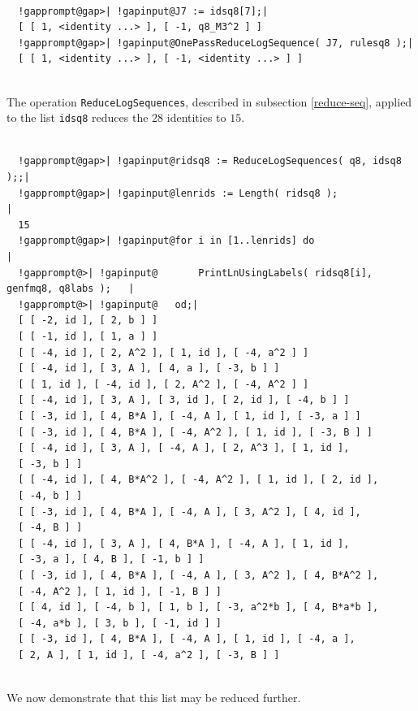 \documentclass[a4paper,11pt]{report}
\begin{document}
{{{ }

 
\begin{Verbatim}[commandchars=!@|,fontsize=\small,frame=single,label=Example]
  
  !gapprompt@gap>| !gapinput@J7 := idsq8[7];|
  [ [ 1, <identity ...> ], [ -1, q8_M3^2 ] ]
  !gapprompt@gap>| !gapinput@OnePassReduceLogSequence( J7, rulesq8 );|
  [ [ 1, <identity ...> ], [ -1, <identity ...> ] ]
  
\end{Verbatim}
 The operation \texttt{ReduceLogSequences}, described in subsection \ref{reduce-seq}, applied to the list \texttt{idsq8} reduces the $28$ identities to $15$. 

 
\begin{Verbatim}[commandchars=!@|,fontsize=\small,frame=single,label=Example]
  
  !gapprompt@gap>| !gapinput@ridsq8 := ReduceLogSequences( q8, idsq8 );;|
  !gapprompt@gap>| !gapinput@lenrids := Length( ridsq8 );                                   |
  15
  !gapprompt@gap>| !gapinput@for i in [1..lenrids] do                                |
  !gapprompt@>| !gapinput@       PrintLnUsingLabels( ridsq8[i], genfmq8, q8labs );   |
  !gapprompt@>| !gapinput@   od;|
  [ [ -2, id ], [ 2, b ] ]
  [ [ -1, id ], [ 1, a ] ]
  [ [ -4, id ], [ 2, A^2 ], [ 1, id ], [ -4, a^2 ] ]
  [ [ -4, id ], [ 3, A ], [ 4, a ], [ -3, b ] ]
  [ [ 1, id ], [ -4, id ], [ 2, A^2 ], [ -4, A^2 ] ]
  [ [ -4, id ], [ 3, A ], [ 3, id ], [ 2, id ], [ -4, b ] ]
  [ [ -3, id ], [ 4, B*A ], [ -4, A ], [ 1, id ], [ -3, a ] ]
  [ [ -3, id ], [ 4, B*A ], [ -4, A^2 ], [ 1, id ], [ -3, B ] ]
  [ [ -4, id ], [ 3, A ], [ -4, A ], [ 2, A^3 ], [ 1, id ], 
  [ -3, b ] ]
  [ [ -4, id ], [ 4, B*A^2 ], [ -4, A^2 ], [ 1, id ], [ 2, id ], 
  [ -4, b ] ]
  [ [ -3, id ], [ 4, B*A ], [ -4, A ], [ 3, A^2 ], [ 4, id ], 
  [ -4, B ] ]
  [ [ -4, id ], [ 3, A ], [ 4, B*A ], [ -4, A ], [ 1, id ], 
  [ -3, a ], [ 4, B ], [ -1, b ] ]
  [ [ -3, id ], [ 4, B*A ], [ -4, A ], [ 3, A^2 ], [ 4, B*A^2 ], 
  [ -4, A^2 ], [ 1, id ], [ -1, B ] ]
  [ [ 4, id ], [ -4, b ], [ 1, b ], [ -3, a^2*b ], [ 4, B*a*b ], 
  [ -4, a*b ], [ 3, b ], [ -1, id ] ]
  [ [ -3, id ], [ 4, B*A ], [ -4, A ], [ 1, id ], [ -4, a ], 
  [ 2, A ], [ 1, id ], [ -4, a^2 ], [ -3, B ] ] 
  
\end{Verbatim}
 We now demonstrate that this list may be reduced further. 

}}
\end{document}
